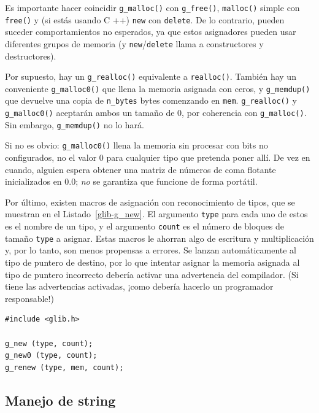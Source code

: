 Es importante hacer coincidir \lstinline{g_malloc()} con \lstinline{g_free()}, \lstinline{malloc()} simple con \lstinline{free()} y (si estás usando C ++) \lstinline[style=GLib/GTK]{new} con \lstinline[style=GLib/GTK]{delete}. De lo contrario, pueden suceder comportamientos no esperados, ya que estos asignadores pueden usar diferentes grupos de memoria (y \lstinline[style=GLib/GTK]{new}/\lstinline[style=GLib/GTK]{delete} llama a constructores y destructores).

Por supuesto, hay un \lstinline{g_realloc()} equivalente a \lstinline{realloc()}. También hay un conveniente \lstinline{g_malloc0()} que llena la memoria asignada con ceros, y \lstinline{g_memdup()} que devuelve una copia de \lstinline{n_bytes} bytes comenzando en \lstinline{mem}. \lstinline{g_realloc()} y \lstinline{g_malloc0()} aceptarán ambos un tamaño de 0, por coherencia con \lstinline{g_malloc()}. Sin embargo, \lstinline{g_memdup()} no lo hará.

Si no es obvio: \lstinline{g_malloc0()} llena la memoria sin procesar con bits no configurados, no el valor 0 para cualquier tipo que pretenda poner allí. De vez en cuando, alguien espera obtener una matriz de números de coma flotante inicializados en 0.0; \emph{no} se garantiza que funcione de forma portátil.

Por último, existen macros de asignación con reconocimiento de tipos, que se muestran en el Listado~\ref{glib-g_new}. El argumento \lstinline{type} para cada uno de estos es el nombre de un tipo, y el argumento \lstinline{count} es el número de bloques de tamaño \lstinline{type} a asignar. Estas macros le ahorran algo de escritura y multiplicación y, por lo tanto, son menos propensas a errores. Se lanzan automáticamente al tipo de puntero de destino, por lo que intentar asignar la memoria asignada al tipo de puntero incorrecto debería activar una advertencia del compilador. (Si tiene las advertencias activadas, ¡como debería hacerlo un programador responsable!)

\begin{lstlisting}[style=GLib/GTK, caption={Macros de asignación}, label=glib-g_new]
#include <glib.h>

g_new (type, count);
g_new0 (type, count);
g_renew (type, mem, count);
\end{lstlisting}

\subsection{Manejo de string}

